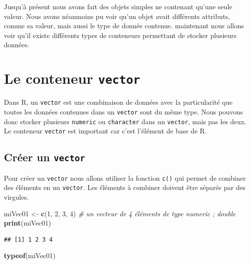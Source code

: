 \documentclass[]{book}
\newenvironment{Shaded}{\begin{snugshade}}{\end{snugshade}}
\newcommand{\KeywordTok}[1]{\textcolor[rgb]{0.13,0.29,0.53}{\textbf{#1}}}
\newcommand{\DecValTok}[1]{\textcolor[rgb]{0.00,0.00,0.81}{#1}}
\newcommand{\StringTok}[1]{\textcolor[rgb]{0.31,0.60,0.02}{#1}}
\newcommand{\CommentTok}[1]{\textcolor[rgb]{0.56,0.35,0.01}{\textit{#1}}}
\newcommand{\NormalTok}[1]{#1}
\begin{document}
Jusqu'à présent nous avons fait des objets simples ne contenant qu'une
seule valeur. Nous avons néanmoins pu voir qu'un objet avait différents
attributs, comme sa valeur, mais aussi le type de donnée contenue.
maintenant nous allons voir qu'il existe différents types de conteneurs
permettant de stocker plusieurs données.

\section{\texorpdfstring{Le conteneur
\texttt{vector}}{Le conteneur vector}}\label{le-conteneur-vector}

Dans R, un \texttt{vector} est une combinaison de données avec la
particularité que toutes les données contenues dans un \texttt{vector}
sont du même type. Nous pouvons donc stocker plusieurs \texttt{numeric}
ou \texttt{character} dans un \texttt{vector}, mais pas les deux. Le
conteneur \texttt{vector} est important car c'est l'élément de base de
R.

\subsection{\texorpdfstring{Créer un
\texttt{vector}}{Créer un vector}}\label{creer-un-vector}

Pour créer un \texttt{vector} nous allons utiliser la fonction
\texttt{c()} qui permet de combiner des éléments en un \texttt{vector}.
Les éléments à combiner doivent être séparés par des virgules.

\begin{Shaded}
\begin{Highlighting}[]
\NormalTok{miVec01 <-}\StringTok{ }\KeywordTok{c}\NormalTok{(}\DecValTok{1}\NormalTok{, }\DecValTok{2}\NormalTok{, }\DecValTok{3}\NormalTok{, }\DecValTok{4}\NormalTok{) }\CommentTok{# un vecteur de 4 éléments de type numeric ; double}
\KeywordTok{print}\NormalTok{(miVec01)}
\end{Highlighting}
\end{Shaded}

\begin{verbatim}
## [1] 1 2 3 4
\end{verbatim}

\begin{Shaded}
\begin{Highlighting}[]
\KeywordTok{typeof}\NormalTok{(miVec01)}
\end{Highlighting}
\end{Shaded}
\end{document}
